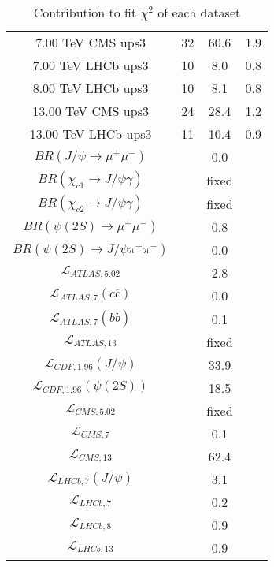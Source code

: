 \begin{table}[h!]
\begin{tabular}{c|c|c|c}
7.00 TeV CMS ups3 & 32 & 60.6 & 1.9 \\
7.00 TeV LHCb ups3 & 10 & 8.0 & 0.8 \\
8.00 TeV LHCb ups3 & 10 & 8.1 & 0.8 \\
13.00 TeV CMS ups3 & 24 & 28.4 & 1.2 \\
13.00 TeV LHCb ups3 & 11 & 10.4 & 0.9 \\
\hline
$BR(J/\psi\rightarrow\mu^+\mu^-)$ &  & 0.0 &  \\
$BR(\chi_{c1}\rightarrow J/\psi\gamma)$ &  & fixed & \\
$BR(\chi_{c2}\rightarrow J/\psi\gamma)$ &  & fixed & \\
$BR(\psi(2S)\rightarrow\mu^+\mu^-)$ &  & 0.8 &  \\
$BR(\psi(2S)\rightarrow J/\psi\pi^+\pi^-)$ &  & 0.0 &  \\
$\mathcal L_{ATLAS,5.02}$ &  & 2.8 &  \\
$\mathcal L_{ATLAS,7}(c\overline c)$ &  & 0.0 &  \\
$\mathcal L_{ATLAS,7}(b\overline b)$ &  & 0.1 &  \\
$\mathcal L_{ATLAS,13}$ &  & fixed & \\
$\mathcal L_{CDF,1.96}(J/\psi)$ &  & 33.9 &  \\
$\mathcal L_{CDF,1.96}(\psi(2S))$ &  & 18.5 &  \\
$\mathcal L_{CMS,5.02}$ &  & fixed & \\
$\mathcal L_{CMS,7}$ &  & 0.1 &  \\
$\mathcal L_{CMS,13}$ &  & 62.4 &  \\
$\mathcal L_{LHCb,7}(J/\psi)$ &  & 3.1 &  \\
$\mathcal L_{LHCb,7}$ &  & 0.2 &  \\
$\mathcal L_{LHCb,8}$ &  & 0.9 &  \\
$\mathcal L_{LHCb,13}$ &  & 0.9 &  \\
\end{tabular}
\caption{Contribution to fit $\chi^2$ of each dataset}
\end{table}
